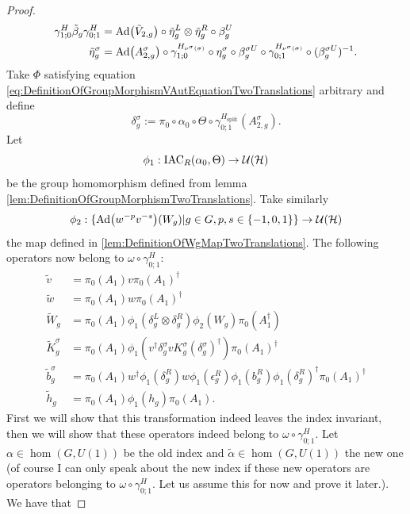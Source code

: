 \documentclass[12pt,a4paper,twoside]{article}
\numberwithin{equation}{section}
\begin{document}
\begin{proof}
	\begin{align}
		\label{eq:IndexInvariantUnderLGAEtaTildeDefiniton1TwoTrans}
		\gamma^{H}_{1;0}\tilde{\beta}_g\gamma^{H}_{0;1}&=\Ad{\tilde V_{2,g}}\circ\tilde{\eta}_g^L\otimes\tilde{\eta}_g^R\circ\beta_g^U\\
		\label{eq:IndexInvariantUnderLGAEtaTildeDefiniton2TwoTrans}
		\tilde{\eta}_g^\sigma&=\Ad{A_{2,g}^\sigma}\circ\gamma^{H_{\nu^{\sigma}(\sigma)}}_{1;0}\circ\eta_g^\sigma\circ\beta_g^{\sigma U}\circ\gamma^{H_{\nu^{\sigma}(\sigma)}}_{0;1}\circ(\beta_g^{\sigma U})^{-1}.
	\end{align}
	Take $\Phi$ satisfying equation \ref{eq:DefinitionOfGroupMorphismVAutEquationTwoTranslations} arbitrary and define 
	\begin{equation}
		\delta_g^\sigma:=\pi_0\circ\alpha_0\circ\Theta\circ\gamma^{H_{\text{split}}}_{0;1}(A_{2,g}^\sigma).
	\end{equation}
	Let
	\begin{equation}
		\phi_1:\textrm{IAC}_R(\alpha_0,\Theta) \rightarrow \mathcal U(\mathcal H)
	\end{equation}
	be the group homomorphism defined from lemma \ref{lem:DefinitionOfGroupMorphismTwoTranslations}. Take similarly
	\begin{equation}
		\phi_2:\{\Ad{w^{-p}v^{-s}}(W_g)|g\in G,p,s\in\{-1,0,1\}\}\rightarrow \UU(\HH)
	\end{equation}
	the map defined in \ref{lem:DefinitionOfWgMapTwoTranslations}. The following operators now belong to $\omega\circ\gamma^{H}_{0;1}:$
	\begin{align}
		\tilde{v}&=\pi_0(A_1)v\pi_0(A_1)^\dagger\\
		\tilde{w}&=\pi_0(A_1)w\pi_0(A_1)^\dagger\\
		\tilde{W}_g&=\pi_0(A_1)\phi_1(\delta^L_g\otimes\delta^R_g)\phi_2( W_g)\pi_0(A_1^\dagger)\\
		\tilde{K}_g^\sigma&=\pi_0(A_1)\phi_1(v^\dagger \delta_g^\sigma v K_g^\sigma (\delta_g^\sigma)^\dagger) \pi_0(A_1)^\dagger\\
		\tilde{b}_g^\sigma&=\pi_0(A_1)w^\dagger \phi_1(\delta_g^R)w \phi_1(\epsilon_g^R)\phi_1(b_g^R)\phi_1(\delta_g^R)^\dagger\pi_0(A_1)^\dagger\\
		\tilde{h}_g&=\pi_0(A_1)\phi_1(h_g)\pi_0(A_1).
	\end{align}
	First we will show that this transformation indeed leaves the index invariant, then we will show that these operators indeed belong to $\omega\circ\gamma^H_{0;1}$. Let $\alpha\in\hom(G,U(1))$ be the old index and $\tilde{\alpha}\in\hom(G,U(1))$ the new one (of course I can only speak about the new index if these new operators are operators belonging to $\omega\circ\gamma^H_{0;1}$. Let us assume this for now and prove it later.). We have that

\end{proof}
\end{document}
